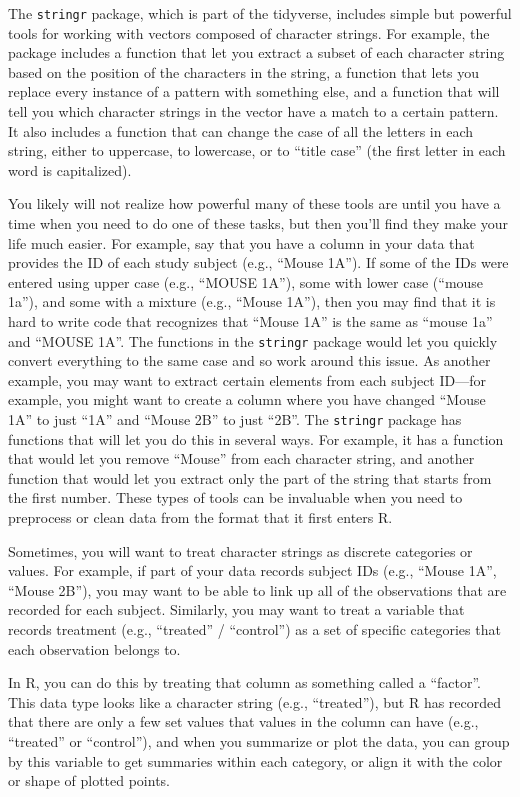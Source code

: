 \documentclass[]{tufte-book}
\begin{document}
The \texttt{stringr} package, which is part of the tidyverse, includes simple but
powerful tools for working with vectors composed of character strings. For
example, the package includes a function that let you extract a subset of each
character string based on the position of the characters in the string, a
function that lets you replace every instance of a pattern with something
else, and a function that will tell you which character strings in the vector
have a match to a certain pattern. It also includes a function that can change
the case of all the letters in each string, either to uppercase, to lowercase,
or to ``title case'' (the first letter in each word is capitalized).

You likely will not realize how powerful many of these tools are
until you have a time when you need to do one of these tasks, but
then you'll find they make your life much easier. For example,
say that you have a column in your data that provides the ID of each study
subject (e.g., ``Mouse 1A''). If some of the IDs were entered using upper
case (e.g., ``MOUSE 1A''), some with lower case (``mouse 1a''), and some with
a mixture (e.g., ``Mouse 1A''), then you may find that it is hard
to write code that recognizes that ``Mouse 1A'' is the same as ``mouse 1a'' and
``MOUSE 1A''. The functions in the \texttt{stringr} package would let you quickly
convert everything to the same case and so work around this issue.
As another example, you may want to extract certain elements from each
subject ID---for example, you might want to create a column where you
have changed ``Mouse 1A'' to just ``1A'' and ``Mouse 2B'' to just ``2B''. The
\texttt{stringr} package has functions that will let you do this in several
ways. For example, it has a function that would let you remove ``Mouse''
from each character string, and another function that would let you
extract only the part of the string that starts from the first number.
These types of tools can be invaluable when you need to preprocess or
clean data from the format that it first enters R.

Sometimes, you will want to treat character strings as discrete categories
or values. For example, if part of your data records subject IDs
(e.g., ``Mouse 1A'', ``Mouse 2B''), you may want to be able to link up all
of the observations that are recorded for each subject. Similarly, you
may want to treat a variable that records treatment (e.g., ``treated'' / ``control'')
as a set of specific categories that each observation belongs to.

In R, you can do this by treating that column as something called a ``factor''.
This data type looks like a character string (e.g., ``treated''), but R has
recorded that there are only a few set values that values in the column can have
(e.g., ``treated'' or ``control''), and when you summarize or plot the data, you can
group by this variable to get summaries within each category, or align it with
the color or shape of plotted points.
\end{document}
